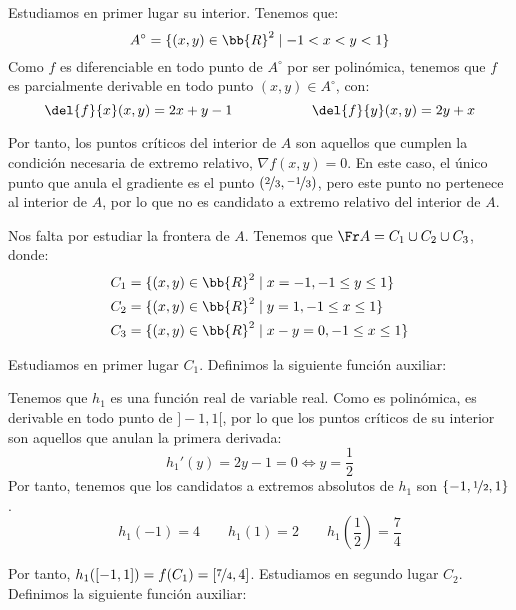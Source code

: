 \begin{ejercicio}
    Estudiamos en primer lugar su interior. Tenemos que: $$A^\circ = \{(x,y)\in \bb{R}^2\mid -1< x < y < 1\}$$
    Como $f$ es diferenciable en todo punto de $A^\circ$ por ser polinómica, tenemos que $f$ es parcialmente derivable en todo punto $(x,y)\in A^\circ$, con:
    \begin{equation*}
        \del{f}{x}(x,y) = 2x+y-1 \hspace{2cm}
        \del{f}{y}(x,y) = 2y+x
    \end{equation*}

    Por tanto, los puntos críticos del interior de $A$ son aquellos que cumplen la condición necesaria de extremo relativo,
    $\nabla f(x,y)=0$. En este caso, el único punto que anula el gradiente es el punto $(\nicefrac{2}{3},\nicefrac{-1}{3})$, pero este punto no pertenece al interior de $A$,
    por lo que no es candidato a extremo relativo del interior de $A$.

    Nos falta por estudiar la frontera de $A$. Tenemos que $\Fr A = C_1\cup C_2\cup C_3$, donde:
    \begin{align*}
        C_1 &= \{(x,y)\in \bb{R}^2\mid x=-1, -1\leq y \leq 1\} \\
        C_2 &= \{(x,y)\in \bb{R}^2\mid y=1, -1\leq x \leq 1\} \\
        C_3 &= \{(x,y)\in \bb{R}^2\mid x-y = 0, -1\leq x \leq 1\}
    \end{align*}

    Estudiamos en primer lugar $C_1$. Definimos la siguiente función auxiliar:

    Tenemos que $h_1$ es una función real de variable real. Como es polinómica, es derivable en todo punto de $]-1,1[$, por lo que los puntos críticos de su interior son aquellos que anulan la primera derivada:
    \begin{equation*}
        h_1'(y) = 2y -1 = 0 \Longleftrightarrow y=\frac{1}{2}
    \end{equation*}
    Por tanto, tenemos que los candidatos a extremos absolutos de $h_1$ son $\{-1,\nicefrac{1}{2},1\}$.
    \begin{equation*}
        h_1(-1)=4 \qquad h_1(1)=2 \qquad h_1\left(\frac{1}{2}\right) = \frac{7}{4}
    \end{equation*}

    Por tanto, $h_1([-1,1])=f(C_1) = \left[\nicefrac{7}{4}, 4\right]$. Estudiamos en segundo lugar $C_2$. Definimos la siguiente función auxiliar:


\end{ejercicio}
